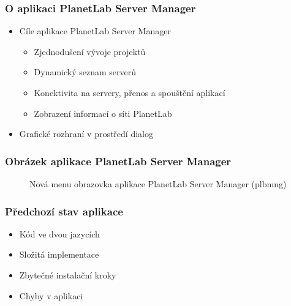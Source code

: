 \documentclass[%
  12pt,       				%
	t,                  %
	aspectratio=1610,   %
	unicode,						%
]{beamer}				    	%
\begin{document}
\begin{frame} 
\frametitle{O aplikaci PlanetLab Server Manager}
\begin{itemize}
	\item Cíle aplikace PlanetLab Server Manager
		\begin{itemize}
			\item Zjednodušení vývoje projektů
			\item Dynamický seznam serverů
			\item Konektivita na servery, přenos a spouštění aplikací
			\item Zobrazení informací o síti PlanetLab
		\end{itemize}
	\item Grafické rozhraní v prostředí dialog
\end{itemize}
\end{frame} 

\begin{frame} 
\frametitle{Obrázek aplikace PlanetLab Server Manager}
\begin{figure}[H]
	\centering
	\caption{Nová menu obrazovka aplikace PlanetLab Server Manager (plbmng)}
	\label{fig:redesigned}
\end{figure}
\end{frame}

\begin{frame} 
\frametitle{Předchozí stav aplikace}
\begin{itemize}
	\item Kód ve dvou jazycích
	\item Složitá implementace
	\item Zbytečné instalační kroky
	\item Chyby v aplikaci

\end{itemize}
\end{frame} 
\end{document}
